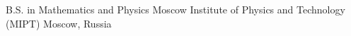 
\begin{cventries}

  \cventry
    {B.S. in Mathematics and Physics}
    {Moscow Institute of Physics and Technology (MIPT)}
    {Moscow, Russia}
    {}
    {
      \begin{cvitems}
      \end{cvitems}
    }

\end{cventries}
